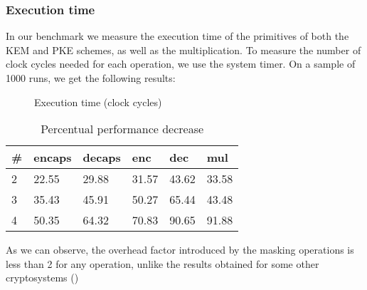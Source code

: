 \subsubsection*{\textbf{Execution time}}
In our benchmark we measure the execution time of the primitives of both the KEM and PKE schemes, as well as the multiplication.
To measure the number of clock cycles needed for each operation, we use the system timer. On a sample of 1000 runs, we get the following results:
\begin{figure}[H]
    \centering
\caption{Execution time (clock cycles)}
\end{figure}
\begin{table}[H]
    \begin{tabular}{llllll}
        \# & encaps & decaps & enc & dec & mul \\ \hline
        2 & 22.55 & 29.88 & 31.57 & 43.62 & 33.58 \\
        3 & 35.43 & 45.91 & 50.27 & 65.44 & 43.48 \\
        4 & 50.35 & 64.32 & 70.83 & 90.65 & 91.88
    \end{tabular}
    \caption{Percentual performance decrease}
\end{table}
As we can observe, the overhead factor introduced by the masking operations is less than 2 for any operation, 
unlike the results obtained for some other cryptosystems (\cite{belaid:hal-02953167,cryptoeprint:2020:733,cryptoeprint:2021:483})

